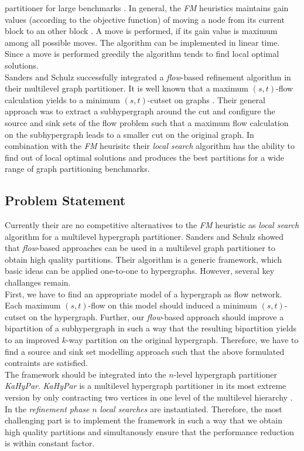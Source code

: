 partitioner for large benchmarks \cite{papa2007hypergraph}. In general, the \emph{FM}
heuristics maintains gain values (according to the objective function) of moving a node
from its current block to an other block \cite{fiduccia1988linear}. A move is performed, 
if its gain value is maximum among all possible moves. The algorithm can be implemented 
in linear time. Since a move is performed greedily the algorithm tends to find local
optimal solutions. \\
Sanders and Schulz \cite{sanders2011engineering} successfully integrated a \emph{flow}-based refinement
algorithm in their multilevel graph partitioner. It is well known that a maximum $(s,t)$-flow
calculation yields to a minimum $(s,t)$-cutset on graphs \cite{ford1956maximal}. Their general
approach was to extract a subhypergraph around the cut and configure the source and sink sets
of the flow problem such that a maximum flow calculation on the subhypergraph leads to a 
smaller cut on the original graph. In combination with the \emph{FM} heurisitc their \emph{local
search} algorithm has the ability to find out of local optimal solutions and produces
the best partitions for a wide range of graph partitioning benchmarks.

\subsection{Problem Statement}

Currently their are no competitive alternatives to the \emph{FM} heuristic as \emph{local search}
algorithm for a multilevel hypergraph partitioner. Sanders and Schulz \cite{sanders2011engineering}
showed that \emph{flow}-based approaches can be used in a multilevel graph partitioner to obtain
high quality partitions. Their algorithm is a generic framework, which basic ideas can be
applied one-to-one to hypergraphs. However, several key challanges remain.\\
First, we have to find an appropriate model of a hypergraph as flow network. Each maximum
$(s,t)$-flow on this model should induced a minimum $(s,t)$-cutset on the hypergraph.
Further, our \emph{flow}-based approach should improve a bipartition of a subhypergraph in such
a way that the resulting bipartition yields to an improved $k$-way partition on the 
original hypergraph. Therefore, we have to find a source and sink set modelling approach
such that the above formulated contraints are satisfied. \\
The framework should be integrated into the $n$-level hypergraph partitioner 
\emph{KaHyPar}. \emph{KaHyPar} is a multilevel hypergraph partitioner in its most extreme 
version by only contracting two vertices in one level of the multilevel hierarchy
\cite{akhremtsev2017engineering,heuer2017improving,schlag2016k}. In the \emph{refinement 
phase} $n$ \emph{local searches} are instantiated. Therefore, the most challenging part is
to implement the framework in such a way that we obtain
high quality partitions and simultanously ensure that the performance reduction is within
constant factor.

